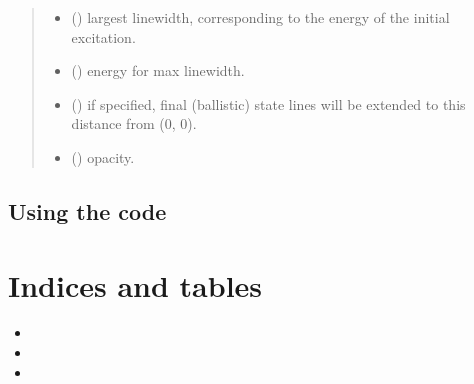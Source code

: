 \documentclass[letterpaper,10pt,english]{sphinxmanual}
\begin{document}
\begin{fulllineitems}
\begin{quote}
\begin{description}
\begin{itemize}
\item {} 
 (\sphinxstyleliteralemphasis{\sphinxupquote{, }}) \textendash{} largest linewidth, corresponding
to the energy of the initial excitation.

\item {} 
 (\sphinxstyleliteralemphasis{\sphinxupquote{, }}) \textendash{} energy for max linewidth.

\item {} 
 (\sphinxstyleliteralemphasis{\sphinxupquote{, }}) \textendash{} if specified, final (ballistic)
state lines will be extended to this distance from (0, 0).

\item {} 
 (\sphinxstyleliteralemphasis{\sphinxupquote{, }}) \textendash{} opacity.

\end{itemize}

\end{description}\end{quote}

\end{fulllineitems}



\section{Using the code}
\label{\detokenize{using:using-the-code}}\label{\detokenize{using::doc}}

\chapter{Indices and tables}
\label{\detokenize{index:indices-and-tables}}\begin{itemize}
\item {} 

\item {} 

\item {} 

\end{itemize}
\end{document}
